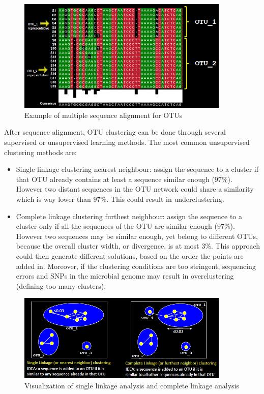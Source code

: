     \begin{figure}[!h]
      \centering
      \includegraphics[width=0.9\textwidth]{OTU_general.png}
      \caption{\label{fig:OTU_general}Example of multiple sequence alignment for OTUs}
    \end{figure}

    After sequence alignment, OTU clustering can be done through several supervised or unsupervised learning methods.
    The most common unsupervised clustering methods are:

    \begin{multicols}{2}
      \begin{itemize}
        \item Single linkage clustering nearest neighbour: assign the sequence to a cluster if that OTU already contains at least a sequence similar enough ($97\%$).
          However two distant sequences in the OTU network could share a similarity which is way lower than $97\%$.
          This could result in underclustering.
        \item Complete linkage clustering furthest neighbour: assign the sequence to a cluster only if all the sequences of the OTU are similar enough ($97\%$).
          However two sequences may be similar enough, yet belong to different OTUs, because the overall cluster width, or divergence, is at most $3\%$.
          This approach could then generate different solutions, based on the order the points are added in.
          Moreover, if the clustering conditions are too stringent, sequencing errors and SNPs in the microbial genome may result in overclustering (defining too many clusters).
      \end{itemize}
    \end{multicols}

    \begin{figure}[!h]
      \centering
      \includegraphics[width=0.9\textwidth]{clustering_methods.png}
      \caption{\label{fig:clustering_methods}Visualization of single linkage analysis and complete linkage analysis}
    \end{figure}

